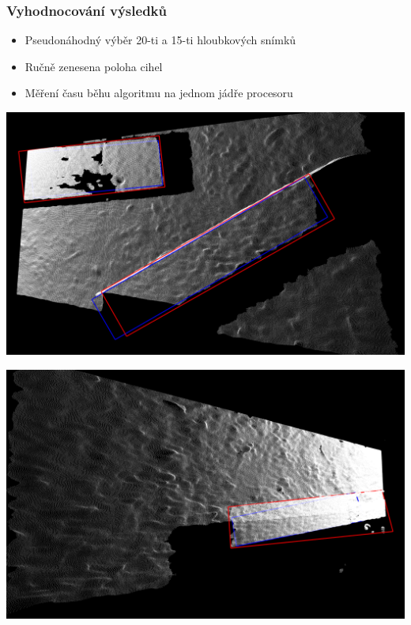 \begin{frame}
    \frametitle{Vyhodnocování výsledků}
    \begin{itemize}
        \item Pseudonáhodný výběr 20-ti a 15-ti hloubkových snímků
        \item Ručně zenesena poloha cihel
        \item Měření času běhu algoritmu na jednom jádře procesoru
    \end{itemize}
    \begin{minipage}{0.49\textwidth}
        \includegraphics[width = \linewidth]{res_det_good.png}
    \end{minipage}
    \begin{minipage}{0.49\textwidth}
        \includegraphics[width = \linewidth]{res_det_bad.png}
    \end{minipage}
\end{frame}

